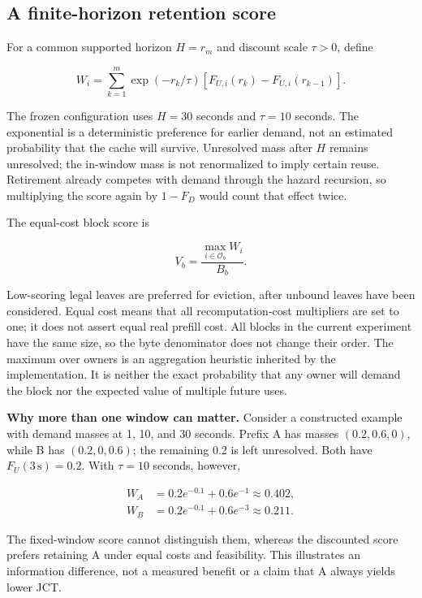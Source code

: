 \documentclass[sigconf, screen, review]{acmart}
\begin{document}
\subsection{A finite-horizon retention
score}\label{a-finite-horizon-retention-score}

For a common supported horizon \(H=r_m\) and discount scale \(\tau>0\),
define

\[
W_i=\sum_{k=1}^{m}\exp(-r_k/\tau)
\left[F_{U,i}(r_k)-F_{U,i}(r_{k-1})\right].
\]

The frozen configuration uses \(H=30\) seconds and \(\tau=10\) seconds.
The exponential is a deterministic preference for earlier demand, not an
estimated probability that the cache will survive. Unresolved mass after
\(H\) remains unresolved; the in-window mass is not renormalized to
imply certain reuse. Retirement already competes with demand through the
hazard recursion, so multiplying the score again by \(1-F_D\) would
count that effect twice.

The equal-cost block score is

\[
V_b=\frac{\max_{i\in\mathcal O_b}W_i}{B_b}.
\]

Low-scoring legal leaves are preferred for eviction, after unbound
leaves have been considered. Equal cost means that all
recomputation-cost multipliers are set to one; it does not assert equal
real prefill cost. All blocks in the current experiment have the same
size, so the byte denominator does not change their order. The maximum
over owners is an aggregation heuristic inherited by the implementation.
It is neither the exact probability that any owner will demand the block
nor the expected value of multiple future uses.

\textbf{Why more than one window can matter.} Consider a constructed
example with demand masses at 1, 10, and 30 seconds. Prefix A has masses
\((0.2,0.6,0)\), while B has \((0.2,0,0.6)\); the remaining 0.2 is left
unresolved. Both have \(F_U(3\,\mathrm{s})=0.2\). With \(\tau=10\)
seconds, however,

\[
\begin{aligned}
W_A&=0.2e^{-0.1}+0.6e^{-1}\approx0.402,\\
W_B&=0.2e^{-0.1}+0.6e^{-3}\approx0.211.
\end{aligned}
\]

The fixed-window score cannot distinguish them, whereas the discounted
score prefers retaining A under equal costs and feasibility. This
illustrates an information difference, not a measured benefit or a claim
that A always yields lower JCT.
\end{document}
